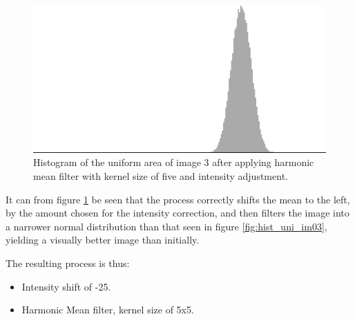\begin{figure}[H]
\centering
\includegraphics[width= \fullImageWidth]{../code/images/histogram_uniform_harmonic_03}
\caption{Histogram of the uniform area of image 3 after applying harmonic mean filter with kernel size of five and intensity adjustment.}
\label{fig:hist_uni_har_im03}
\end{figure}


It can from figure \ref{fig:hist_uni_har_im03} be seen that the process correctly shifts the mean to the left, by the amount chosen for the intensity correction, and then filters the image into a narrower normal distribution than that seen in figure \ref{fig:hist_uni_im03}, yielding a visually better image than initially.

The resulting process is thus:
\begin{itemize}
 \item Intensity shift of -25.
 \item Harmonic Mean filter, kernel size of 5x5.
\end{itemize}

